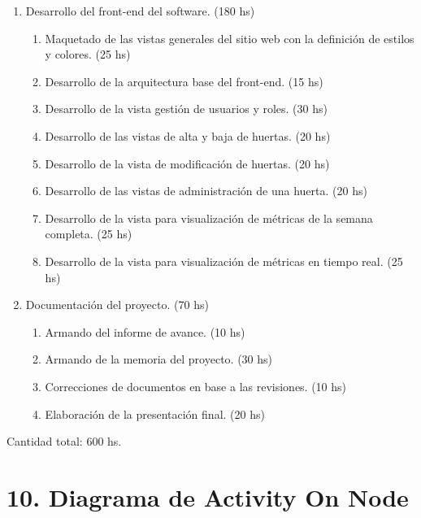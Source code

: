 \documentclass[
11pt, %
codirector, %
]{charter}
\begin{document}
\begin{enumerate}
\item Desarrollo del front-end del software. (180 hs)
	\begin{enumerate}
	\item Maquetado de las vistas generales del sitio web con la definición de estilos y colores. (25 hs)
	\item Desarrollo de la arquitectura base del front-end. (15 hs)
	\item Desarrollo de la vista gestión de usuarios y roles. (30 hs)
	\item Desarrollo de las vistas de alta y baja de huertas. (20 hs)
	\item Desarrollo de la vista de modificación de huertas. (20 hs)
	\item Desarrollo de las vistas de administración de una huerta. (20 hs)
	\item Desarrollo de la vista para visualización de métricas de la semana completa. (25 hs)
	\item Desarrollo de la vista para visualización de métricas en tiempo real. (25 hs)
	\end{enumerate}

\item Documentación del proyecto. (70 hs)
	\begin{enumerate}
	\item Armando del informe de avance. (10 hs)
	\item Armando de la memoria del proyecto. (30 hs)
	\item Correcciones de documentos en base a las revisiones. (10 hs)
	\item Elaboración de la presentación final. (20 hs)
	\end{enumerate}	
	
\end{enumerate}

Cantidad total: 600 hs.

\section{10. Diagrama de Activity On Node}
\label{sec:AoN}
\end{document}
